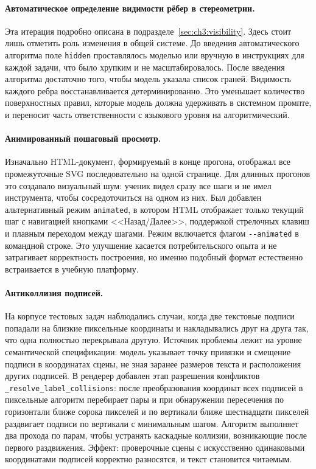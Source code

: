 \paragraph{Автоматическое определение видимости рёбер в стереометрии.} Эта итерация подробно описана в подразделе~\ref{sec:ch3:visibility}. Здесь стоит лишь отметить роль изменения в общей системе. До введения автоматического алгоритма поле \texttt{hidden} проставлялось моделью или вручную в инструкциях для каждой задачи, что было хрупким и не масштабировалось. После введения алгоритма достаточно того, чтобы модель указала список граней. Видимость каждого ребра восстанавливается детерминированно. Это уменьшает количество поверхностных правил, которые модель должна удерживать в системном промпте, и переносит часть ответственности с языкового уровня на алгоритмический.

\paragraph{Анимированный пошаговый просмотр.} Изначально HTML\nobreakdash-документ, формируемый в конце прогона, отображал все промежуточные SVG последовательно на одной странице. Для длинных прогонов это создавало визуальный шум: ученик видел сразу все шаги и не имел инструмента, чтобы сосредоточиться на одном из них. Был добавлен альтернативный режим \texttt{animated}, в котором HTML отображает только текущий шаг с навигацией кнопками <<Назад/Далее>>, поддержкой стрелочных клавиш и плавным переходом между шагами. Режим включается флагом \texttt{-{}-animated} в командной строке. Это улучшение касается потребительского опыта и не затрагивает корректность построения, но именно подобный формат естественно встраивается в учебную платформу.

\paragraph{Антиколлизия подписей.} На корпусе тестовых задач наблюдались случаи, когда две текстовые подписи попадали на близкие пиксельные координаты и накладывались друг на друга так, что одна полностью перекрывала другую. Источник проблемы лежит на уровне семантической спецификации: модель указывает точку привязки и смещение подписи в координатах сцены, не зная заранее размеров текста и расположения других подписей. В рендерер добавлен этап разрешения конфликтов \texttt{\_resolve\_label\_collisions}: после преобразования координат всех подписей в пиксельные алгоритм перебирает пары и при обнаружении пересечения по горизонтали ближе сорока пикселей и по вертикали ближе шестнадцати пикселей раздвигает подписи по вертикали с минимальным шагом. Алгоритм выполняет два прохода по парам, чтобы устранять каскадные коллизии, возникающие после первого раздвижения. Эффект: проверочные сцены с искусственно одинаковыми координатами подписей корректно разносятся, и текст становится читаемым.

